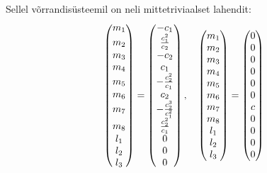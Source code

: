 Sellel võrrandisüsteemil on neli mittetriviaalset lahendit:
\renewcommand\arraystretch{1.3}
\begin{align*}
    \begin{pmatrix}
        m_1 \\ m_2\vphantom{\frac{c_1^2}{c_2}} \\ m_3 \\ m_4 \\
        m_5\vphantom{\frac{c_2^2}{c_1}} \\ m_6 \\
        m_7\vphantom{\frac{c_2^3}{c_1^2}} \\
        m_8\vphantom{\frac{c_2^2}{c_1}} \\ l_1 \\ l_2 \\ l_3
    \end{pmatrix} = 
    \begin{pmatrix}
        -c_1 \\ \frac{c_1^2}{c_2} \\ -c_2 \\ c_1 \\ -\frac{c_2^2}{c_1} \\
        c_2 \\ -\frac{c_2^3}{c_1^2} \\ \frac{c_2^2}{c_1} \\ 0 \\ 0 \\ 0
    \end{pmatrix},
    \quad
    \begin{pmatrix}
        m_1 \\ m_2 \\ m_3 \\ m_4 \\ m_5 \\ m_6 \\ m_7 \\ m_8 \\ l_1 \\ l_2 \\ l_3
    \end{pmatrix} = 
    \begin{pmatrix}
        0 \\ 0 \\ 0 \\ 0 \\ 0 \\ 0 \\ c \\ 0 \\ 0 \\ 0 \\ 0

\end{pmatrix}
\end{align*}
